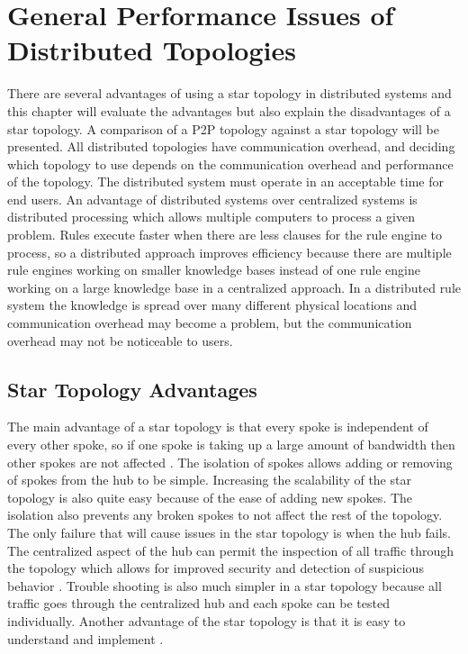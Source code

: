 \documentclass[12pt]{report}
\begin{document}
\chapter{General Performance Issues of Distributed Topologies}
There are several advantages of using a star topology in distributed systems and this chapter will evaluate the advantages but also explain the disadvantages of a star topology.  A comparison of a P2P topology against a star topology will be presented.  All distributed topologies have communication overhead, and deciding which topology to use depends on the communication overhead and performance of the topology.  The distributed system must operate in an acceptable time for end users.  An advantage of distributed systems over centralized systems is distributed processing which allows multiple computers to process a given problem.  Rules execute faster when there are less clauses for the rule engine to process, so a distributed approach improves efficiency because there are multiple rule engines working on smaller knowledge bases instead of one rule engine working on a large knowledge base in a centralized approach.  In a distributed rule system the knowledge is spread over many different physical locations and communication overhead may become a problem, but the communication overhead may not be noticeable to users.

\section{Star Topology Advantages}
The main advantage of a star topology is that every spoke is independent of every other spoke, so if one spoke is taking up a large amount of bandwidth then other spokes are not affected \cite{StarAdvantages}.  The isolation of spokes allows adding or removing of spokes from the hub to be simple.  Increasing the scalability of the star topology is also quite easy because of the ease of adding new spokes.  The isolation also prevents any broken spokes to not affect the rest of the topology. The only failure that will cause issues in the star topology is when the hub fails.  The centralized aspect of the hub can permit the inspection of all traffic through the topology which allows for improved security and detection of suspicious behavior \cite{StarAdvantages}.  Trouble shooting is also much simpler in a star topology because all traffic goes through the centralized hub and each spoke can be tested individually.  Another advantage of the star topology is that it is easy to understand and implement \cite{StarAdvantages}. 
\end{document}
